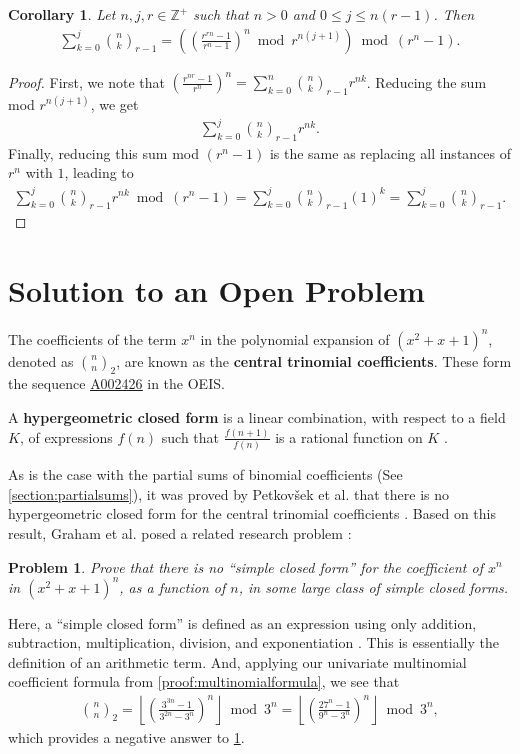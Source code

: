 \documentclass[10pt,a4paper]{article}
\theoremstyle{plain}
\newtheorem{corollary}{Corollary}[section]
\newtheorem{problem}{Problem}[section]
\newcommand{\floor}[1]{\left\lfloor #1 \right\rfloor}
\newcommand{\seqnum}[1]{\href{https://oeis.org/#1}{\rm \underline{#1}}}
\begin{document}
\begin{corollary} \label{proof:multinomialcoeffpartialsums}
Let $n,j,r \in \mathbb{Z}^+$ such that $n > 0$ and $0 \leq j \leq n (r-1)$. Then
\begin{align*}
\sum_{k=0}^{j} \binom{n}{k}_{r-1}
= \left( \left( \frac{r^{rn}-1}{r^n-1} \right)^n \bmod r^{n(j+1)} \right) \bmod (r^n-1) .
\end{align*}
\end{corollary}
\begin{proof}
First, we note that $\left(\frac{r^{nr}-1}{r^n}\right)^n = \sum_{k=0}^n \binom{n}{k}_{r-1} r^{nk}$. Reducing the sum mod $r^{n(j+1)}$, we get
\begin{align*}
    \sum_{k=0}^{j} \binom{n}{k}_{r-1} r^{nk} .
\end{align*}
Finally, reducing this sum mod $(r^n-1)$ is the same as replacing all instances of $r^n$ with $1$, leading to
\begin{align*}
    \sum_{k=0}^{j} \binom{n}{k}_{r-1} r^{nk} \bmod (r^n-1)
    = \sum_{k=0}^{j} \binom{n}{k}_{r-1} (1)^{k}
    = \sum_{k=0}^{j} \binom{n}{k}_{r-1} .
\end{align*}
\end{proof}

\section{Solution to an Open Problem} \label{section:centraltrinomialcoefficients}
The coefficients of the term $x^n$ in the polynomial expansion of $(x^2+x+1)^n$, denoted as $\binom{n}{n}_2$, are known as the \textbf{central trinomial coefficients}. These form the sequence \seqnum{A002426} in the OEIS. 

A \textbf{hypergeometric closed form} is a linear combination, with respect to a field $K$, of expressions $f(n)$ such that $\frac{f(n+1)}{f(n)}$ is a rational function on $K$ \cite{petkovsek1996ab, sauras2018thesis}.

As is the case with the partial sums of binomial coefficients (See \cref{section:partialsums}), it was proved by Petkovšek et al. that there is no hypergeometric closed form for the central trinomial coefficients \cite{petkovsek1996ab}. Based on this result, Graham et al. posed a related research problem \cite{graham1994concrete}:
\begin{problem} \label{problem:grahametal}
Prove that there is no ``simple closed form'' for the coefficient of $x^n$ in $(x^2+x+1)^n$, as a function of $n$, in some large class of simple closed forms.
\end{problem}
Here, a ``simple closed form'' is defined as an expression using only addition, subtraction, multiplication, division, and exponentiation \cite{graham1994concrete}. This is essentially the definition of an arithmetic term. And, applying our univariate multinomial coefficient formula from \cref{proof:multinomialformula}, we see that
\begin{align*}
    \binom{n}{n}_2 = \floor{\left(\frac{3^{3n} - 1}{3^{2n} - 3^n}\right)^n} \bmod 3^n
    = \floor{\left(\frac{27^n - 1}{9^n - 3^n}\right)^n} \bmod 3^n ,
\end{align*}
which provides a negative answer to \cref{problem:grahametal}.
\end{document}
